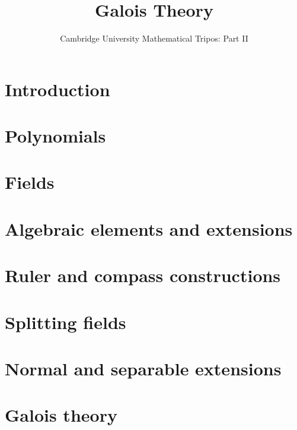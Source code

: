 \documentclass{article}
\title{Galois Theory}
\author{Cambridge University Mathematical Tripos: Part II}
\begin{document}
\maketitle

\tableofcontentsnewpage{}

\section{Introduction}

\section{Polynomials}

\section{Fields}

\section{Algebraic elements and extensions}

\section{Ruler and compass constructions}

\section{Splitting fields}

\section{Normal and separable extensions}

\section{Galois theory}

\end{document}
